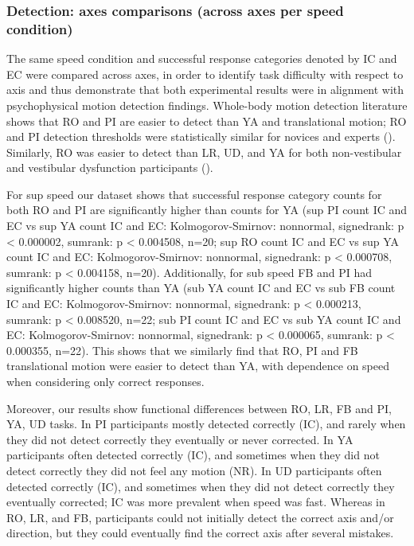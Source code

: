 \documentclass[11pt, onecolumn]{article}
\begin{document}
\subsubsection{Detection: axes comparisons (across axes per speed condition)}
The same speed condition and successful response categories denoted by IC and EC were compared across axes, in order to identify task difficulty with respect to axis and thus demonstrate that both experimental results were in alignment with psychophysical motion detection findings.  Whole-body motion detection literature shows that RO and PI are easier to detect than YA and translational motion; RO and PI detection thresholds were statistically similar for novices and experts (\cite{Hartmann_2014_Direction}).  Similarly, RO was easier to detect than LR, UD, and YA for both non-vestibular and vestibular dysfunction participants (\cite{Valko_2012_Vestibular}). 

For sup speed our dataset shows that successful response category counts for both RO and PI are significantly higher than counts for YA (sup PI count IC and EC vs sup YA count IC and EC: Kolmogorov-Smirnov: nonnormal, signedrank: p < 0.000002, sumrank: p < 0.004508, n=20; sup RO count IC and EC vs sup YA count IC and EC: Kolmogorov-Smirnov: nonnormal, signedrank: p < 0.000708, sumrank: p < 0.004158, n=20).  Additionally, for sub speed FB and PI had significantly higher counts than YA (sub YA count IC and EC vs sub FB count IC and EC: Kolmogorov-Smirnov: nonnormal, signedrank: p < 0.000213, sumrank: p < 0.008520, n=22; sub PI count IC and EC vs sub YA count IC and EC: Kolmogorov-Smirnov: nonnormal, signedrank: p < 0.000065, sumrank: p < 0.000355, n=22).  This shows that we similarly find that RO, PI and FB translational motion were easier to detect than YA, with dependence on speed when considering only correct responses.

Moreover, our results show functional differences between RO, LR, FB and PI, YA, UD tasks.  In PI participants mostly detected correctly (IC), and rarely when they did not detect correctly they eventually or never corrected.  In YA participants often detected correctly (IC), and sometimes when they did not detect correctly they did not feel any motion (NR).  In UD participants often detected correctly (IC),  and sometimes when they did not detect correctly they eventually corrected; IC was more prevalent when speed was fast.  Whereas in RO, LR, and FB, participants could not initially detect the correct axis and/or direction, but they could eventually find the correct axis after several mistakes.
\end{document}
